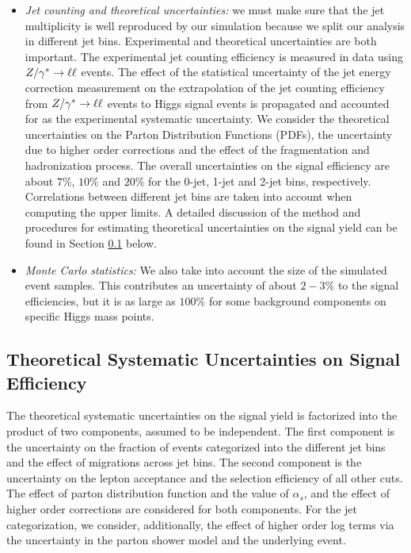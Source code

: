 \begin{itemize}
\item {\it Jet counting and theoretical uncertainties:} 
we must make sure that the jet multiplicity is well reproduced by our 
simulation because we split our analysis in different jet bins. 
Experimental and theoretical uncertainties are both important.
The experimental jet counting efficiency is measured in data 
using $Z/\gamma^*\to\ell\ell$ events. The effect of the statistical uncertainty 
of the jet energy correction measurement on the extrapolation
of the jet counting efficiency from $Z/\gamma^*\to\ell\ell$ events to Higgs signal
events is propagated and accounted for as the experimental 
systematic uncertainty.
We consider the theoretical uncertainties on the Parton Distribution Functions (PDFs), 
the uncertainty due to higher order corrections and the effect of the fragmentation and 
hadronization process. The overall uncertainties on the signal efficiency are 
about $7\%$, $10\%$ and $20\%$ for the 0-jet, 1-jet and 2-jet bins, respectively.
Correlations between different jet bins are taken into account when computing
the upper limits. A detailed discussion of the method and procedures for estimating
theoretical uncertainties on the signal yield can be found in 
Section \ref{sec:theorySystematicsSignal} below.

\item {\it Monte Carlo statistics:} We also take into account the 
size of the simulated event samples. 
This contributes an uncertainty of about $2-3\%$ to the signal
efficiencies, but it is as large as $100\%$ for some background components on specific
Higgs mass points.
\end{itemize}

\subsection{Theoretical Systematic Uncertainties on Signal Efficiency}
\label{sec:theorySystematicsSignal}
The theoretical systematic uncertainties on the signal yield is factorized into the
product of two components, assumed to be independent. The first component is the uncertainty
on the fraction of events categorized into the different jet bins and the effect
of migrations across jet bins. The second component is the uncertainty
on the lepton acceptance and the selection efficiency of all other cuts. The effect of
parton distribution function and the value of $\alpha_{s}$, and the effect of 
higher order corrections are considered for both components. For the jet categorization,
we consider, additionally, the effect of higher order log terms via the uncertainty in the 
parton shower model and the underlying event.

